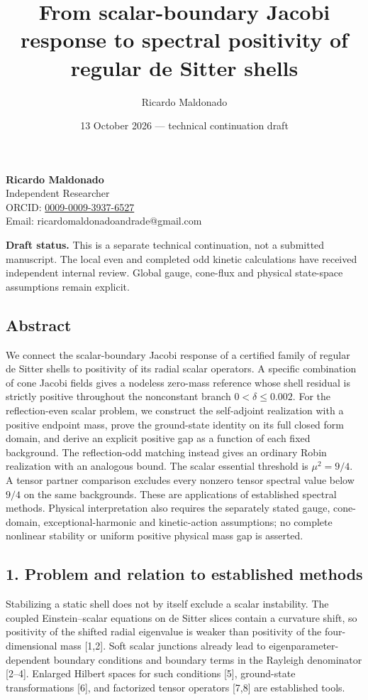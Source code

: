\documentclass[
  11pt,
]{article}
\title{From scalar-boundary Jacobi response to spectral positivity of
regular de Sitter shells}
\author{Ricardo Maldonado}
\date{13 October 2026 --- technical continuation draft}
\begin{document}
\maketitle

\textbf{Ricardo Maldonado}\\
Independent Researcher\\
ORCID:
\href{https://orcid.org/0009-0009-3937-6527}{0009-0009-3937-6527}\\
Email: ricardomaldonadoandrade@gmail.com

\textbf{Draft status.} This is a separate technical continuation, not a
submitted manuscript. The local even and completed odd kinetic
calculations have received independent internal review. Global gauge,
cone-flux and physical state-space assumptions remain explicit.

\subsection{Abstract}\label{abstract}

We connect the scalar-boundary Jacobi response of a certified family of
regular de Sitter shells to positivity of its radial scalar operators. A
specific combination of cone Jacobi fields gives a nodeless zero-mass
reference whose shell residual is strictly positive throughout the
nonconstant branch \(0<\delta\le 0.002\). For the reflection-even scalar
problem, we construct the self-adjoint realization with a positive
endpoint mass, prove the ground-state identity on its full closed form
domain, and derive an explicit positive gap as a function of each fixed
background. The reflection-odd matching instead gives an ordinary Robin
realization with an analogous bound. The scalar essential threshold is
\(\mu^2=9/4\). A tensor partner comparison excludes every nonzero tensor
spectral value below \(9/4\) on the same backgrounds. These are
applications of established spectral methods. Physical interpretation
also requires the separately stated gauge, cone-domain,
exceptional-harmonic and kinetic-action assumptions; no complete
nonlinear stability or uniform positive physical mass gap is asserted.

\subsection{1. Problem and relation to established
methods}\label{problem-and-relation-to-established-methods}

Stabilizing a static shell does not by itself exclude a scalar
instability. The coupled Einstein--scalar equations on de Sitter slices
contain a curvature shift, so positivity of the shifted radial
eigenvalue is weaker than positivity of the four-dimensional mass
{[}1,2{]}. Soft scalar junctions already lead to
eigenparameter-dependent boundary conditions and boundary terms in the
Rayleigh denominator {[}2--4{]}. Enlarged Hilbert spaces for such
conditions {[}5{]}, ground-state transformations {[}6{]}, and factorized
tensor operators {[}7,8{]} are established tools.
\end{document}
